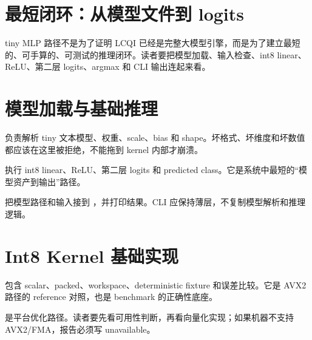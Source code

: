\section{最短闭环：从模型文件到 logits}

tiny MLP 路径不是为了证明 LCQI 已经是完整大模型引擎，而是为了建立最短的、可手算的、可测试的推理闭环。读者要把模型加载、输入检查、int8 linear、ReLU、第二层 logits、argmax 和 CLI 输出连起来看。

\section{模型加载与基础推理}

 负责解析 tiny 文本模型、权重、scale、bias 和 shape。坏格式、坏维度和坏数值都应该在这里被拒绝，不能拖到 kernel 内部才崩溃。



 执行 int8 linear、ReLU、第二层 logits 和 predicted class。它是系统中最短的“模型资产到输出”路径。



 把模型路径和输入接到 ，并打印结果。CLI 应保持薄层，不复制模型解析和推理逻辑。



\section{Int8 Kernel 基础实现}

 包含 scalar、packed、workspace、deterministic fixture 和误差比较。它是 AVX2 路径的 reference 对照，也是 benchmark 的正确性底座。



 是平台优化路径。读者要先看可用性判断，再看向量化实现；如果机器不支持 AVX2/FMA，报告必须写 unavailable。


